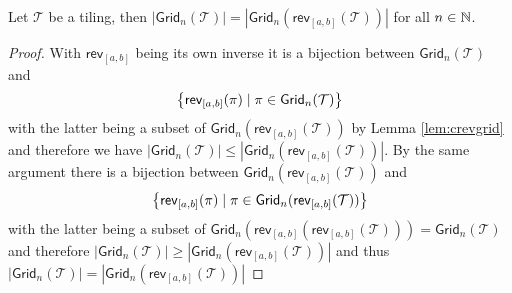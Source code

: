 \begin{proposition}\label{prop:rrtil}
Let $\mathcal{T}$ be a tiling, then $|\textsf{Grid}_n(\mathcal{T})| = |\textsf{Grid}_n(\textsf{rev}_{[a,b]}(\mathcal{T}))|$ for all $n\in\mathbb{N}$.
\end{proposition}
\begin{proof}
With $\textsf{rev}_{[a,b]}$ being its own inverse it is a bijection between $\textsf{Grid}_n(\mathcal{T})$ and
\[
\left\{\textsf{rev}_{[a,b]}(\pi) \mid \pi \in \textsf{Grid}_n(\mathcal{T})\right\}
\]
with the latter being a subset of $\textsf{Grid}_n(\textsf{rev}_{[a,b]}(\mathcal{T}))$ by Lemma \ref{lem:crevgrid} and therefore we have $|\textsf{Grid}_n(\mathcal{T})| \leq |\textsf{Grid}_n(\textsf{rev}_{[a,b]}(\mathcal{T}))|$. By the same argument there is a bijection between $\textsf{Grid}_n(\textsf{rev}_{[a,b]}(\mathcal{T}))$ and
\[
    \left\{\textsf{rev}_{[a,b]}(\pi) \mid \pi \in \textsf{Grid}_n(\textsf{rev}_{[a,b]}(\mathcal{T}))\right\}
\]
with the latter being a subset of $\textsf{Grid}_n(\textsf{rev}_{[a,b]}(\textsf{rev}_{[a,b]}(\mathcal{T})))=\textsf{Grid}_n(\mathcal{T})$ and therefore $|\textsf{Grid}_n(\mathcal{T})| \geq |\textsf{Grid}_n(\textsf{rev}_{[a,b]}(\mathcal{T}))|$ and thus $|\textsf{Grid}_n(\mathcal{T})| = |\textsf{Grid}_n(\textsf{rev}_{[a,b]}(\mathcal{T}))|$
\end{proof}